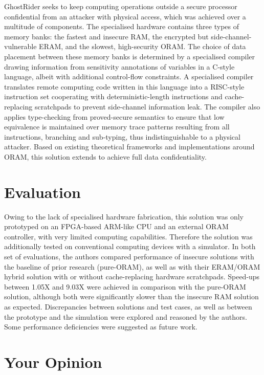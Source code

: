 \documentclass[11pt]{article}
\begin{document}
GhostRider seeks to keep computing operations outside a secure processor confidential from an attacker with physical access, which was achieved over a multitude of components. The specialised hardware contains three types of memory banks: the fastest and insecure RAM, the encrypted but side-channel-vulnerable ERAM, and the slowest, high-security ORAM. The choice of data placement between these memory banks is determined by a specialised compiler drawing information from sensitivity annotations of variables in a C-style language, albeit with additional control-flow constraints. A specialised compiler translates remote computing code written in this language into a RISC-style instruction set cooperating with deterministic-length instructions and cache-replacing scratchpads to prevent side-channel information leak. The compiler also applies type-checking from proved-secure semantics to ensure that low equivalence is maintained over memory trace patterns resulting from all instructions, branching and sub-typing, thus indistinguishable to a physical attacker. Based on existing theoretical frameworks and implementations around ORAM, this solution extends to achieve full data confidentiality. 

\section*{Evaluation}

Owing to the lack of specialised hardware fabrication, this solution was only prototyped on an FPGA-based ARM-like CPU and an external ORAM controller, with very limited computing capabilities. Therefore the solution was additionally tested on conventional computing devices with a simulator. In both set of evaluations, the authors compared performance of insecure solutions with the baseline of prior research (pure-ORAM), as well as with their ERAM/ORAM hybrid solution with or without cache-replacing hardware scratchpads. Speed-ups between 1.05X and 9.03X were achieved in comparison with the pure-ORAM solution, although both were significantly slower than the insecure RAM solution as expected. Discrepancies between solutions and test cases, as well as between the prototype and the simulation were explored and reasoned by the authors. Some performance deficiencies were suggested as future work. 

\section*{Your Opinion}
\end{document}
